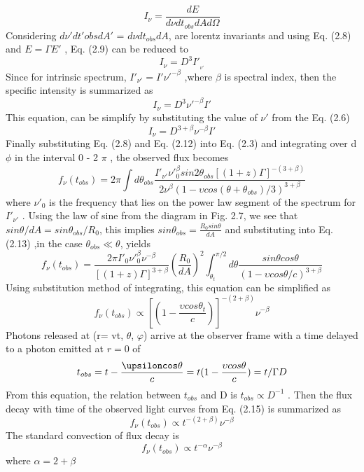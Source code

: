 \begin{equation}
I_{\nu} =\frac{dE}{d\nu dt_{obs}dAd\Omega}
\end{equation}
Considering $ d\nu'dt'{obs}dA' $ = $ d\nu dt_{obs} dA $, are lorentz invariants and using Eq. (2.8) and $ E=\Gamma E' $ , Eq. (2.9) can be reduced to
\begin{equation}
I_{\nu} =D^{3}I'_{_{\nu'}}
\end{equation}
Since for intrinsic spectrum, $ I'_{\nu'}= I'\nu'^{-\beta} $ ,where $\beta $ is spectral index, then the specific intensity is summarized as
\begin{equation}
I_{\nu}= D^{3}\nu'^{-\beta}I'
\end{equation}
This equation, can be simplify by substituting the value of $\nu'$ from the Eq. (2.6)
\begin{equation}
I_{\nu} = D^{3+\beta}\nu^{-\beta}I'
\end{equation}
Finally substituting Eq. (2.8) and Eq. (2.12) into Eq. (2.3) and integrating
over  d$\phi $ in the interval   0  -  2 $\pi$  , the observed flux becomes
\begin{equation}
f_{\nu}(t_{obs}) = 2 \pi \int d\theta_{obs}\frac{I'_{\nu'}\nu'_{0}^{\beta}sin 2\theta_{obs}[(1+z)\Gamma]^{-(3+\beta)}}{2\nu^{\beta}(1-\upsilon cos(\theta+\theta_{obs})/3)^{3+\beta}}
\end{equation}
where $ \nu'_{0} $ is the  frequency that lies on the power law segment of the spectrum for $ I'_{\nu'} $ . Using the law of sine from the diagram in Fig. 2.7, we see that $sin\theta/dA =sin\theta_{obs}/R_{0} $, this implies $ sin\theta_{obs}= \frac{R_{0}sin\theta}{dA}$ and substituting into Eq. (2.13) ,in the case $ \theta _{obs} \ll  \theta $, yields
\begin{equation}
f_{\nu}(t_{obs})=\frac{2\pi I'_{0} \nu'_{0}^{\beta}\nu^{-\beta}}{[(1+z)\Gamma]^{3+\beta}} (\frac{R_{0}}{dA})^{2}\int _{\theta _{t}}^{\pi/2}d\theta \frac{sin\theta cos\theta}{(1- \upsilon cos\theta/ c)^{3+\beta} }
\end{equation}
Using substitution method of integrating, this equation can be simplified as
\begin{equation}
f_{\nu}(t_{obs})\propto [(1 -\frac{\upsilon cos\theta_{t}}{c} )]^{-(2+\beta)}\nu^{-\beta}
\end{equation}
Photons released at (r= vt, $\theta$, $\varphi $) arrive at the observer frame with a time delayed to
a photon emitted at $ r = 0 $ of
\begin{equation}
t_{obs}= t-\frac{\upsiloncos\theta}{c}= t(1-\frac{\upsilon cos\theta}{c})=t/\Gamma D
\end{equation}
From this equation, the relation between $ t_{obs} $ and D is $t_{obs}  \propto D^{-1} $ . Then the flux decay with time of the observed light curves from Eq. (2.15) is summarized as
\begin{equation}
f_{\nu}(t_{obs})\propto t^{-(2+\beta)}\nu^{-\beta}
\end{equation}
The standard convection of flux decay is
\begin{equation}
f_{\nu}(t_{obs}) \propto t^{-\alpha}\nu^{-\beta}
\end{equation}
where $ \alpha = 2 + \beta $
